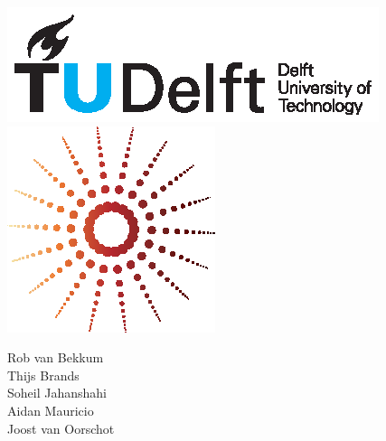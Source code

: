 \documentclass{article}
\begin{document}
\begin{figure}
    \begin{minipage}[H]{0.33\textwidth}
		\vspace{0.3cm}
		\includegraphics[scale=0.8]{images/TUDelftLogo.eps}
	\end{minipage}
	\begin{minipage}[H]{0.33\textwidth}
		\begin{center}
		\end{center}
		
		\begin{center}
			\includegraphics[scale=0.8]{images/Lg.eps}	
		
		\end{center}
	\end{minipage}
	\begin{minipage}[H]{0.33\textwidth}
			\begin{flushright}
				\small{Rob van Bekkum }\\
				\small{Thijs Brands }\\
				\small{Soheil Jahanshahi }\\
				\small{Aidan Mauricio }\\
				\small{Joost van Oorschot }

			\end{flushright}
			
	\end{minipage}
\end{figure}
\end{document}

